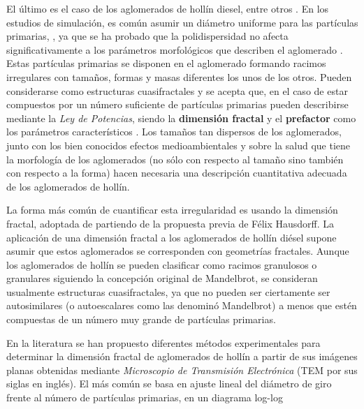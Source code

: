 \par El último es el caso de los aglomerados de hollín diesel, entre otros \cite{lapuertaetal:2007}. En los estudios de simulación, es común asumir un diámetro uniforme para las partículas primarias, \cite{wuetal:1993,tandonetal:1995,ohetal:1997,leeetal:2002,zhuetal:2003}, ya que se ha probado que la polidispersidad no afecta significativamente a los parámetros morfológicos que describen el aglomerado \cite{busheletal:1998}. Estas partículas primarias se disponen en el aglomerado formando racimos irregulares con tamaños, formas y masas diferentes los unos de los otros. Pueden considerarse como estructuras cuasifractales y se acepta que, en el caso de estar compuestos por un número suficiente de partículas primarias pueden describirse mediante la \emph{Ley de Potencias}, siendo la \textbf{dimensión fractal} y el \textbf{prefactor} como los parámetros característicos \cite{bonczyketal:1991}. Los tamaños tan dispersos de los aglomerados, junto con los bien conocidos efectos medioambientales y sobre la salud que tiene la morfología de los aglomerados (no sólo con respecto al tamaño sino también con respecto a la forma) \cite{kittleson:1998,meakinetal:1989} hacen necesaria una descripción cuantitativa adecuada de los aglomerados de hollín.

\par La forma más común de cuantificar esta irregularidad es usando la dimensión fractal, adoptada de \cite{mandelbrot:1983} partiendo de la propuesta previa de Félix Hausdorff. La aplicación de una dimensión fractal a los aglomerados de hollín diésel supone asumir que estos aglomerados se corresponden con geometrías fractales. Aunque los aglomerados de hollín se pueden clasificar como racimos granulosos o granulares siguiendo la concepción original de Mandelbrot, se consideran usualmente estructuras cuasifractales, ya que no pueden ser ciertamente ser autosimilares (o autoescalares como las denominó Mandelbrot) a menos que estén compuestas de un número muy grande de partículas primarias.

\par En la literatura se han propuesto diferentes métodos experimentales para determinar la dimensión fractal de aglomerados de hollín a partir de sus imágenes planas obtenidas mediante \textit{Microscopio de Transmisión Electrónica} (TEM por sus siglas en inglés). El más común se basa en ajuste lineal del diámetro de giro frente al número de partículas primarias, en un diagrama log-log \cite{leeetal:2002}

